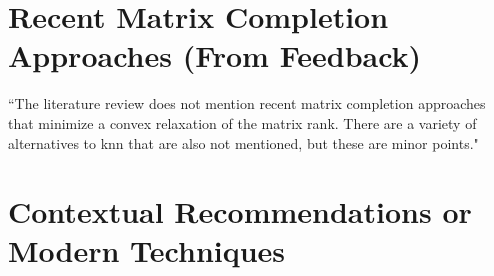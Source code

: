 




\section{Recent Matrix Completion Approaches (From Feedback)}
``The literature review does not mention recent matrix completion approaches that minimize a convex relaxation of the matrix rank. There are a variety of alternatives to knn that are also not mentioned, but these are minor points."

\section{Contextual Recommendations or Modern Techniques}



